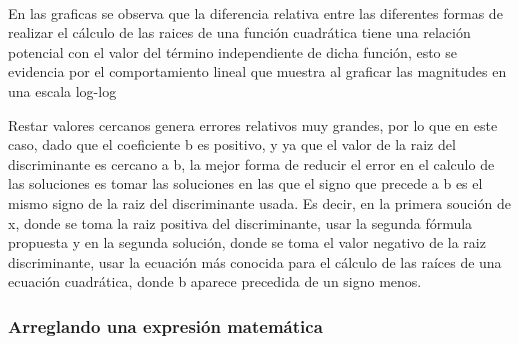\documentclass[11pt]{article}
\begin{document}
    \begin{center}
    \end{center}
    { \hspace*{\fill} \\}
    
    En las graficas se observa que la diferencia relativa entre las
diferentes formas de realizar el cálculo de las raices de una función
cuadrática tiene una relación potencial con el valor del término
independiente de dicha función, esto se evidencia por el comportamiento
lineal que muestra al graficar las magnitudes en una escala log-log

Restar valores cercanos genera errores relativos muy grandes, por lo que
en este caso, dado que el coeficiente b es positivo, y ya que el valor
de la raiz del discriminante es cercano a b, la mejor forma de reducir
el error en el calculo de las soluciones es tomar las soluciones en las
que el signo que precede a b es el mismo signo de la raiz del
discriminante usada. Es decir, en la primera soución de x, donde se toma
la raiz positiva del discriminante, usar la segunda fórmula propuesta y
en la segunda solución, donde se toma el valor negativo de la raiz
discriminante, usar la ecuación más conocida para el cálculo de las
raíces de una ecuación cuadrática, donde b aparece precedida de un signo
menos.

    \hypertarget{arreglando-una-expresiuxf3n-matemuxe1tica}{%
\subsubsection{Arreglando una expresión
matemática}\label{arreglando-una-expresiuxf3n-matemuxe1tica}}
\end{document}
